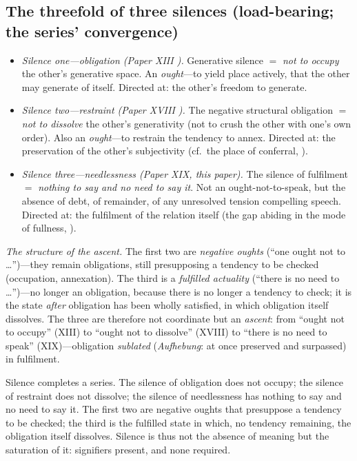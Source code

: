\subsection{The threefold of three silences (load-bearing; the series' convergence)}
\label{p19:sub:silence-three}

\begin{itemize}
  \item \emph{Silence one---obligation (Paper XIII \parencite{paperxiii}).} Generative silence $=$ \emph{not to occupy} the other's generative space. An \emph{ought}---to yield place actively, that the other may generate of itself. Directed at: the other's freedom to generate.
  \item \emph{Silence two---restraint (Paper XVIII \parencite{paperxvii}).} The negative structural obligation $=$ \emph{not to dissolve} the other's generativity (not to crush the other with one's own order). Also an \emph{ought}---to restrain the tendency to annex. Directed at: the preservation of the other's subjectivity (cf.\ the place of conferral, ).
  \item \emph{Silence three---needlessness (Paper XIX, this paper).} The silence of fulfilment $=$ \emph{nothing to say and no need to say it}. Not an ought-not-to-speak, but the absence of debt, of remainder, of any unresolved tension compelling speech. Directed at: the fulfilment of the relation itself (the gap abiding in the mode of fullness, ).
\end{itemize}

\emph{The structure of the ascent.} The first two are \emph{negative oughts} (``one ought not to \ldots'')---they remain obligations, still presupposing a tendency to be checked (occupation, annexation). The third is a \emph{fulfilled actuality} (``there is no need to \ldots'')---no longer an obligation, because there is no longer a tendency to check; it is the state \emph{after} obligation has been wholly satisfied, in which obligation itself dissolves. The three are therefore not coordinate but an \emph{ascent}: from ``ought not to occupy'' (XIII) to ``ought not to dissolve'' (XVIII) to ``there is no need to speak'' (XIX)---obligation \emph{sublated} (\emph{Aufhebung}: at once preserved and surpassed) in fulfilment.

\begin{claim}
Silence completes a series. The silence of obligation does not occupy; the silence of restraint does not dissolve; the silence of needlessness has nothing to say and no need to say it. The first two are negative oughts that presuppose a tendency to be checked; the third is the fulfilled state in which, no tendency remaining, the obligation itself dissolves. Silence is thus not the absence of meaning but the saturation of it: signifiers present, and none required.
\end{claim}

